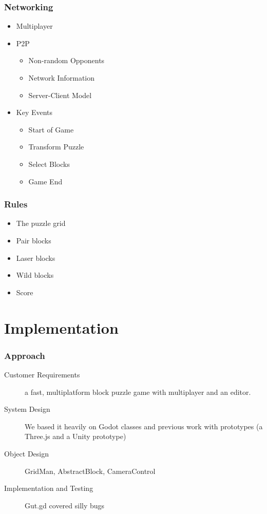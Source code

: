 \documentclass{beamer}
\begin{document}
\begin{frame}
    \frametitle{Networking} %
    \begin{itemize}
        \item Multiplayer
        \pause \item P2P
        \begin{itemize}
            \pause \item Non-random Opponents
            \pause \item Network Information
	    \pause \item Server-Client Model
        \end{itemize}
        \pause \item Key Events
        \begin{itemize}
            \pause \item Start of Game
            \pause \item Transform Puzzle
            \pause \item Select Blocks
            \pause \item Game End
	\end{itemize}
    \end{itemize}
\end{frame}

\begin{frame}
    \frametitle{Rules} %
    \begin{itemize}
	\item The puzzle grid
	\pause \item Pair blocks
	\pause \item Laser blocks
	\pause \item Wild blocks
	\pause \item Score
	\end{itemize}

\end{frame}

\section{Implementation}
\begin{frame}
  \frametitle{Approach}
  \begin{description}
      \item[Customer Requirements] a fast, multiplatform  block puzzle game
          with multiplayer and an editor.
      \item[System Design] We based it heavily on Godot classes and
          previous work with prototypes (a Three.js and a Unity prototype)
      \item[Object Design] GridMan, AbstractBlock, CameraControl
      \item[Implementation and Testing] Gut.gd covered silly bugs
  \end{description}
\end{frame}
\end{document}
